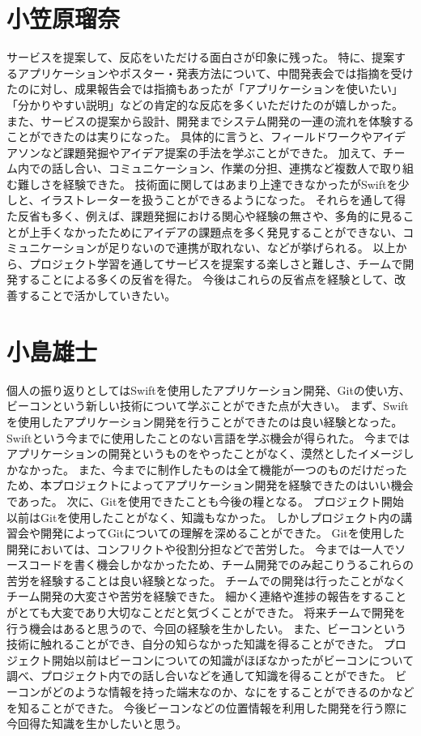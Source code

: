 \documentclass[openany,11pt,papersize]{jsbook}
\begin{document}

\section{小笠原瑠奈}
サービスを提案して、反応をいただける面白さが印象に残った。
特に、提案するアプリケーションやポスター・発表方法について、中間発表会では指摘を受けたのに対し、成果報告会では指摘もあったが「アプリケーションを使いたい」「分かりやすい説明」などの肯定的な反応を多くいただけたのが嬉しかった。
また、サービスの提案から設計、開発までシステム開発の一連の流れを体験することができたのは実りになった。
具体的に言うと、フィールドワークやアイデアソンなど課題発掘やアイデア提案の手法を学ぶことができた。
加えて、チーム内での話し合い、コミュニケーション、作業の分担、連携など複数人で取り組む難しさを経験できた。
技術面に関してはあまり上達できなかったがSwiftを少しと、イラストレーターを扱うことができるようになった。
それらを通して得た反省も多く、例えば、課題発掘における関心や経験の無さや、多角的に見ることが上手くなかったためにアイデアの課題点を多く発見することができない、コミュニケーションが足りないので連携が取れない、などが挙げられる。
以上から、プロジェクト学習を通してサービスを提案する楽しさと難しさ、チームで開発することによる多くの反省を得た。
今後はこれらの反省点を経験として、改善することで活かしていきたい。


\section{小島雄士}
個人の振り返りとしてはSwiftを使用したアプリケーション開発、Gitの使い方、ビーコンという新しい技術について学ぶことができた点が大きい。
まず、Swiftを使用したアプリケーション開発を行うことができたのは良い経験となった。
Swiftという今までに使用したことのない言語を学ぶ機会が得られた。
今まではアプリケーションの開発というものをやったことがなく、漠然としたイメージしかなかった。
また、今までに制作したものは全て機能が一つのものだけだったため、本プロジェクトによってアプリケーション開発を経験できたのはいい機会であった。
次に、Gitを使用できたことも今後の糧となる。
プロジェクト開始以前はGitを使用したことがなく、知識もなかった。
しかしプロジェクト内の講習会や開発によってGitについての理解を深めることができた。
Gitを使用した開発においては、コンフリクトや役割分担などで苦労した。
今までは一人でソースコードを書く機会しかなかったため、チーム開発でのみ起こりうるこれらの苦労を経験することは良い経験となった。
チームでの開発は行ったことがなくチーム開発の大変さや苦労を経験できた。
細かく連絡や進捗の報告をすることがとても大変であり大切なことだと気づくことができた。
将来チームで開発を行う機会はあると思うので、今回の経験を生かしたい。
また、ビーコンという技術に触れることができ、自分の知らなかった知識を得ることができた。
プロジェクト開始以前はビーコンについての知識がほぼなかったがビーコンについて調べ、プロジェクト内での話し合いなどを通して知識を得ることができた。
ビーコンがどのような情報を持った端末なのか、なにをすることができるのかなどを知ることができた。
今後ビーコンなどの位置情報を利用した開発を行う際に今回得た知識を生かしたいと思う。
\end{document}
